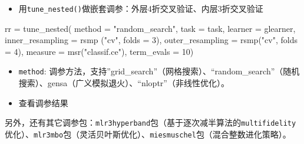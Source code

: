 \documentclass[
  11pt,
  ignorenonframetext,
  dvipsnames,UTF8]{beamer}
\newenvironment{Shaded}{\begin{snugshade}}{\end{snugshade}}
\newcommand{\AttributeTok}[1]{\textcolor[rgb]{0.77,0.63,0.00}{#1}}
\newcommand{\CommentTok}[1]{\textcolor[rgb]{0.56,0.35,0.01}{\textit{#1}}}
\newcommand{\DecValTok}[1]{\textcolor[rgb]{0.00,0.00,0.81}{#1}}
\newcommand{\FunctionTok}[1]{\textcolor[rgb]{0.00,0.00,0.00}{#1}}
\newcommand{\NormalTok}[1]{#1}
\newcommand{\OtherTok}[1]{\textcolor[rgb]{0.56,0.35,0.01}{#1}}
\newcommand{\SpecialCharTok}[1]{\textcolor[rgb]{0.00,0.00,0.00}{#1}}
\newcommand{\StringTok}[1]{\textcolor[rgb]{0.31,0.60,0.02}{#1}}
\providecommand{\tightlist}{%
  \setlength{\itemsep}{0pt}\setlength{\parskip}{0pt}}
\begin{document}
\begin{frame}[fragile]{}
\protect\hypertarget{section-42}{}
\begin{itemize}
\tightlist
\item
  用\texttt{tune\_nested()}做嵌套调参：外层4折交叉验证、内层3折交叉验证
\end{itemize}

\begin{Shaded}
\begin{Highlighting}[]
\NormalTok{rr }\OtherTok{=} \FunctionTok{tune\_nested}\NormalTok{(}
  \AttributeTok{method =} \StringTok{"random\_search"}\NormalTok{,}
  \AttributeTok{task =}\NormalTok{ task,}
  \AttributeTok{learner =}\NormalTok{ glearner,}
  \AttributeTok{inner\_resampling =} \FunctionTok{rsmp}\NormalTok{ (}\StringTok{"cv"}\NormalTok{, }\AttributeTok{folds =} \DecValTok{3}\NormalTok{),}
  \AttributeTok{outer\_resampling =} \FunctionTok{rsmp}\NormalTok{(}\StringTok{"cv"}\NormalTok{, }\AttributeTok{folds =} \DecValTok{4}\NormalTok{),}
  \AttributeTok{measure =} \FunctionTok{msr}\NormalTok{(}\StringTok{"classif.ce"}\NormalTok{),}
  \AttributeTok{term\_evals =} \DecValTok{10}\NormalTok{)}
\end{Highlighting}
\end{Shaded}

\begin{itemize}
\tightlist
\item
  \texttt{method}:
  调参方法，支持''grid\_search''（网格搜索）、``random\_search''（随机搜索）、gensa（广义模拟退火）、``nloptr''（非线性优化）。
\end{itemize}
\end{frame}

\begin{frame}[fragile]{}
\protect\hypertarget{section-43}{}
\begin{itemize}
\tightlist
\item
  查看调参结果
\end{itemize}

\begin{Shaded}
\end{Shaded}

\begin{Shaded}
\end{Shaded}

另外，还有其它调参包：\texttt{mlr3hyperband}包（基于逐次减半算法的\texttt{multifidelity}优化）、\texttt{mlr3mbo}包（灵活贝叶斯优化）、\texttt{miesmuschel}包（混合整数进化策略）。
\end{frame}
\end{document}
